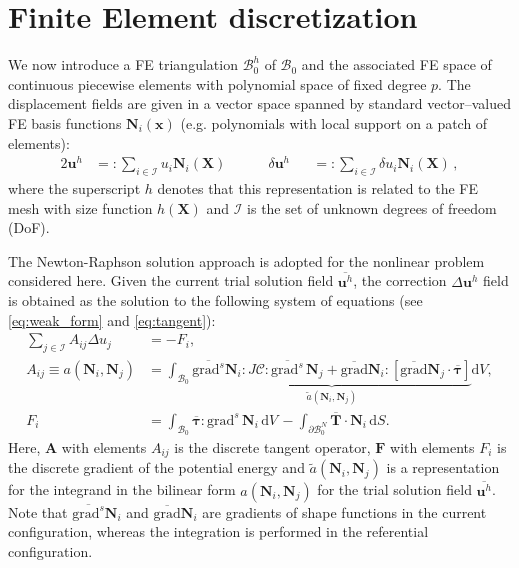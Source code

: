 \documentclass[AMA,STIX1COL]{WileyNJD-v2}
\newcommand*{\gz}[1]{\boldsymbol{#1}}
\newcommand*{\grad}{\mathrm{grad}}
\renewcommand*{\d}{\mathrm{d}}
\newcommand*{\mcl}[1]{\mathcal{#1}}
\begin{document}
\section{Finite Element discretization}
\label{sec:fe}

We now introduce a FE triangulation $\mathcal{B}^h_0$ of $\mcl B_0$ and
the associated FE space of continuous piecewise elements with polynomial space of fixed degree $p$. %
The displacement fields are given in
a vector space spanned by standard vector--valued FE basis functions $\gz N_i(\gz x)$ (e.g. polynomials with local support on a patch of elements):
\begin{alignat}{2}
       \gz u^h &=:  \sum_{i \in \mcl I} u_i \gz N_i (\gz X) \quad \quad \quad
\delta \gz u^h &&=: \sum_{i \in \mcl I} \delta u_i \gz N_i (\gz X) \,,
\end{alignat}
where the superscript $h$ denotes that this representation is related to the FE mesh with size function $h(\gz X)$ and $\mcl I$ is the set of unknown degrees of freedom (DoF).

The Newton-Raphson solution approach is adopted for the nonlinear problem considered here.
Given the current trial solution field $\overline{\gz u^h}$, the correction $\Delta \gz u^h$ field is obtained as the solution to the following
system of equations (see \eqref{eq:weak_form} and \eqref{eq:tangent}):
\begin{align}
  \sum_{j \in \mcl I} A_{ij} \Delta u_j &= - F_i , \label{eq:linear_system} \\
  A_{ij} \equiv a(\gz N_i, \gz N_j) &=
  \int_{\mcl B_0}
  \underbrace{
  \overline{\grad^s} \gz N_i : J \boldsymbol{\mathcal{C}} : \overline{\grad^s} \, \gz N_j
  +
  \overline{\grad}\gz N_i :
  \left[
  \overline{\grad} \gz N_j \cdot
  \overline{\gz \tau}
  \right]
  }_{\displaystyle \tilde{a}(\gz N_i, \gz N_j)}
  \d V ,
  \label{eq:algebraic_tangent}
  \\
  F_i &=
  \int_{\mcl B_0} \overline{\gz \tau} : \grad^{s} \, \gz N_i \, \d V \,
  -
  \int_{\partial \mcl B_0^N} \overline{\gz T} \cdot \gz N_i \, \d S.
\end{align}
Here, $\gz A$ with elements $A_{ij}$ is the discrete tangent operator, $\gz F$ with elements $F_i$ is the discrete gradient of the potential energy
and $\tilde{a}(\gz N_i, \gz N_j)$ is a representation for the integrand in the bilinear form $a(\gz N_i, \gz N_j)$ for the trial solution field $\overline{\gz u^h}$.
Note that $\overline{\grad^s} \gz N_i$ and $\overline{\grad} \gz N_i$ are gradients of shape functions in the current configuration,
whereas the integration is performed in the referential configuration.
\end{document}
